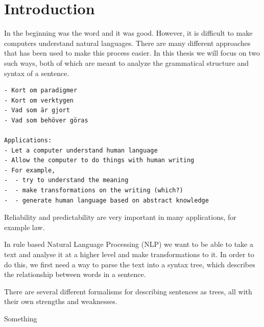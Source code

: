 \documentclass{article}
\begin{document}






\section{Introduction}

In the beginning was the word and it was good. However, it is difficult to make computers understand natural languages. There are many different approaches that has been used to make this process easier. In this thesis we will focus on two such ways, both of which are meant to analyze the grammatical structure and syntax of a sentence.

\begin{verbatim}
- Kort om paradigmer
- Kort om verktygen
- Vad som är gjort
- Vad som behöver göras

Applications:
- Let a computer understand human language
- Allow the computer to do things with human writing
- For example,
-  - try to understand the meaning
-  - make transformations on the writing (which?)
-  - generate human language based on abstract knowledge
\end{verbatim}

Reliability and predictability are very important in many applications, for example law.


In rule based Natural Language Processing (NLP) we want to be able to take a text and analyse it at a higher level and make transformations to it.
In order to do this, we first need a way to parse the text into a syntax tree, which describes the relationship between words in a sentence.



There are several different formalisms for describing sentences as trees, all with their own strengths and weaknesses.

Something
\end{document}

